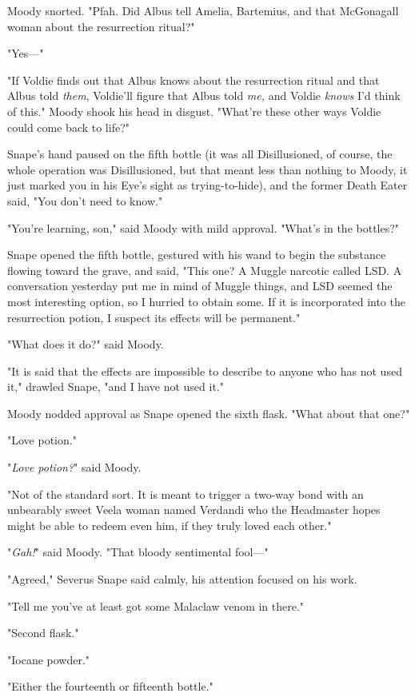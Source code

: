 Moody snorted. "Pfah. Did Albus tell Amelia, Bartemius, and that McGonagall
woman about the resurrection ritual?"

"Yes—"

"If Voldie finds out that Albus knows about the resurrection ritual and that
Albus told \emph{them}, Voldie'll figure that Albus told \emph{me,} and Voldie
\emph{knows} I'd think of this." Moody shook his head in disgust. "What're
these other ways Voldie could come back to life?"

Snape's hand paused on the fifth bottle (it was all Disillusioned, of course,
the whole operation was Disillusioned, but that meant less than nothing to
Moody, it just marked you in his Eye's sight as trying-to-hide), and the former
Death Eater said, "You don't need to know."

"You're learning, son," said Moody with mild approval. "What's in the bottles?"

Snape opened the fifth bottle, gestured with his wand to begin the substance
flowing toward the grave, and said, "This one? A Muggle narcotic called LSD. A
conversation yesterday put me in mind of Muggle things, and LSD seemed the most
interesting option, so I hurried to obtain some. If it is incorporated into the
resurrection potion, I suspect its effects will be permanent."

"What does it do?" said Moody.

"It is said that the effects are impossible to describe to anyone who has not
used it," drawled Snape, "and I have not used it."

Moody nodded approval as Snape opened the sixth flask. "What about that one?"

"Love potion."

"\emph{Love potion?}" said Moody.

"Not of the standard sort. It is meant to trigger a two-way bond with an
unbearably sweet Veela woman named Verdandi who the Headmaster hopes might be
able to redeem even him, if they truly loved each other."

"\emph{Gah!}" said Moody. "That bloody sentimental fool—"

"Agreed," Severus Snape said calmly, his attention focused on his work.

"Tell me you've at least got some Malaclaw venom in there."

"Second flask."

"Iocane powder."

"Either the fourteenth or fifteenth bottle."

